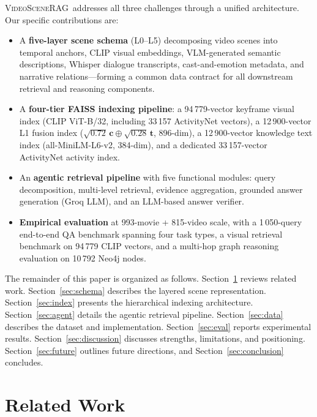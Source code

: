 \documentclass[11pt]{article}
\newcommand{\system}{\textsc{VideoSceneRAG}}
\begin{document}
\system\ addresses all three challenges through a unified architecture.  Our
specific contributions are:

\begin{itemize}[leftmargin=1.4em]
  \item A \textbf{five-layer scene schema} (L0--L5) decomposing video scenes
        into temporal anchors, CLIP visual embeddings, VLM-generated semantic
        descriptions, Whisper dialogue transcripts, cast-and-emotion metadata,
        and narrative relations---forming a common data contract for all
        downstream retrieval and reasoning components.
  \item A \textbf{four-tier FAISS indexing pipeline}: a 94\,779-vector
        keyframe visual index (CLIP ViT-B/32, including 33\,157 ActivityNet
        vectors), a 12\,900-vector L1 fusion index
        ($\sqrt{0.72}\,\mathbf{c}\oplus\sqrt{0.28}\,\mathbf{t}$, 896-dim), a
        12\,900-vector knowledge text index (all-MiniLM-L6-v2, 384-dim), and
        a dedicated 33\,157-vector ActivityNet activity index.
  \item An \textbf{agentic retrieval pipeline} with five functional modules:
        query decomposition, multi-level retrieval, evidence aggregation,
        grounded answer generation (Groq LLM), and an LLM-based answer
        verifier.
  \item \textbf{Empirical evaluation} at 993-movie + 815-video scale, with a
        1\,050-query end-to-end QA benchmark spanning four task types, a visual
        retrieval benchmark on 94\,779 CLIP vectors, and a multi-hop graph
        reasoning evaluation on 10\,792 Neo4j nodes.
\end{itemize}

The remainder of this paper is organized as follows.  Section~\ref{sec:related}
reviews related work.  Section~\ref{sec:schema} describes the layered scene
representation.  Section~\ref{sec:index} presents the hierarchical indexing
architecture.  Section~\ref{sec:agent} details the agentic retrieval pipeline.
Section~\ref{sec:data} describes the dataset and implementation.
Section~\ref{sec:eval} reports experimental results.  Section~\ref{sec:discussion}
discusses strengths, limitations, and positioning.
Section~\ref{sec:future} outlines future directions, and
Section~\ref{sec:conclusion} concludes.

\section{Related Work}
\label{sec:related}
\end{document}
